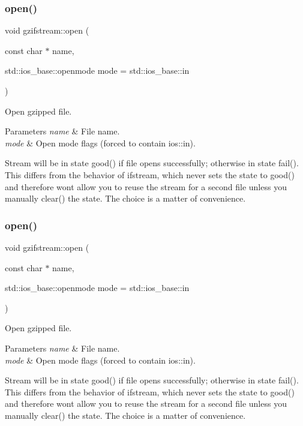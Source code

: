 \subsubsection{\texorpdfstring{open()}{open()}\hspace{0.1cm}{\footnotesize\ttfamily [1/2]}}
{\footnotesize\ttfamily void gzifstream\+::open (\begin{DoxyParamCaption}\item[{const char $\ast$}]{name,  }\item[{std\+::ios\+\_\+base\+::openmode}]{mode = {\ttfamily std\+:\+:ios\+\_\+base\+:\+:in} }\end{DoxyParamCaption})}



Open gzipped file. 


\begin{DoxyParams}{Parameters}
{\em name} & File name. \\
\hline
{\em mode} & Open mode flags (forced to contain ios\+::in).\\
\hline
\end{DoxyParams}
Stream will be in state good() if file opens successfully; otherwise in state fail(). This differs from the behavior of ifstream, which never sets the state to good() and therefore won\textquotesingle{}t allow you to reuse the stream for a second file unless you manually clear() the state. The choice is a matter of convenience. \mbox{\label{classgzifstream_a8105f9300d36dafbe8b10c204583f5a1}} 
\subsubsection{\texorpdfstring{open()}{open()}\hspace{0.1cm}{\footnotesize\ttfamily [2/2]}}
{\footnotesize\ttfamily void gzifstream\+::open (\begin{DoxyParamCaption}\item[{const char $\ast$}]{name,  }\item[{std\+::ios\+\_\+base\+::openmode}]{mode = {\ttfamily std\+:\+:ios\+\_\+base\+:\+:in} }\end{DoxyParamCaption})}



Open gzipped file. 


\begin{DoxyParams}{Parameters}
{\em name} & File name. \\
\hline
{\em mode} & Open mode flags (forced to contain ios\+::in).\\
\hline
\end{DoxyParams}
Stream will be in state good() if file opens successfully; otherwise in state fail(). This differs from the behavior of ifstream, which never sets the state to good() and therefore won\textquotesingle{}t allow you to reuse the stream for a second file unless you manually clear() the state. The choice is a matter of convenience. 

